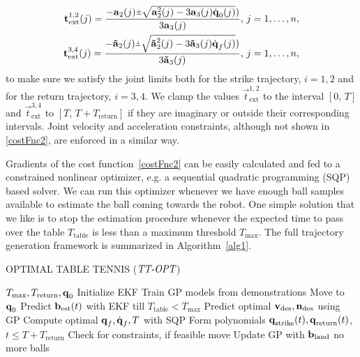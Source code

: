 %
\begin{align}
\vec{t}_{\mathrm{ext}}^{1,2}(j) = \frac{-\vec{a}_2(j) \rpm \sqrt{\vec{a}_2^2(j) - 3\vec{a}_3(j)\dot{\joint}_0(j)})}{3\vec{a}_3(j)}, \, j = 1, \ldots, n,\\
\vec{t}_{\mathrm{ext}}^{3,4}(j) = \frac{-\vec{\tilde{a}}_2(j) \rpm \sqrt{\vec{\tilde{a}}_2^2(j) - 3\vec{\tilde{a}}_3(j)\dot{\joint}_f(j)})}{3\vec{\tilde{a}}_3(j)}, \, j = 1, \ldots, n,
\label{jointPosExtrema}
\end{align}
%
\noindent to make sure we satisfy the joint limits both for the strike trajectory, $i = 1,2$ and for the return trajectory, $i = 3,4$. We clamp the values $\vec{t}^{1,2}_{\mathrm{ext}}$ to the interval $[0, \, T]$ and $\vec{t}^{3,4}_{\mathrm{ext}}$ to $[T, \, T + T_{\mathrm{return}}]$ if they are imaginary or outside their corresponding intervals. Joint velocity and acceleration constraints, although not shown in \eqref{costFnc2}, are enforced in a similar way.

Gradients of the cost function~\eqref{costFnc2} can be easily calculated and fed to a constrained nonlinear optimizer, e.g. a sequential quadratic programming (SQP) based solver. We can run this optimizer whenever we have enough ball samples available to estimate the ball coming towards the robot. One simple solution that we like is to stop the estimation procedure whenever the expected time to pass over the table $T_{\mathrm{table}}$ is less than a maximum threshold $T_{\mathrm{max}}$. The full trajectory generation framework is summarized in Algorithm~\ref{alg1}.

\begin{algorithm}[tb]
   \caption{OPTIMAL TABLE TENNIS ($\emph{TT-OPT}$)}
   \label{alg1}
\begin{algorithmic}
    $T_{\mathrm{max}}, T_{\mathrm{return}}, \boldsymbol{\mathrm{q}}_0$ 
   \STATE Initialize EKF
   \STATE Train GP models from demonstrations
   \STATE Move to $\boldsymbol{\mathrm{q}}_0$
   \REPEAT 
	   \STATE Predict $\boldsymbol{\mathrm{b}}_{\mathrm{est}}(t)$ with EKF till $T_{\mathrm{table}} < T_{\mathrm{max}}$
	   \STATE Predict optimal $\boldsymbol{\mathrm{v}}_{\mathrm{des}}, \boldsymbol{\mathrm{n}}_{\mathrm{des}}$ using GP
	   \STATE Compute optimal $\boldsymbol{\mathrm{q}}_f, \dot{\boldsymbol{\mathrm{q}}}_f, T$ with SQP
	   \STATE Form polynomials $\boldsymbol{\mathrm{q}}_{\mathrm{strike}}(t), \boldsymbol{\mathrm{q}}_{\mathrm{return}}(t)$, $t \leq T + T_{\mathrm{return}}$
	   \STATE Check for constraints, if feasible move
	   \STATE Update GP with $\boldsymbol{\mathrm{b}}_{\mathrm{land}}$	
   \UNTIL no more balls
\end{algorithmic}
\end{algorithm}